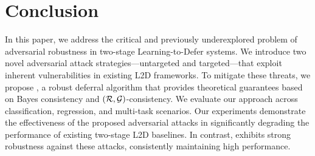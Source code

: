 \section{Conclusion}  
In this paper, we address the critical and previously underexplored problem of adversarial robustness in two-stage Learning-to-Defer systems. We introduce two novel adversarial attack strategies—untargeted and targeted—that exploit inherent vulnerabilities in existing L2D frameworks. To mitigate these threats, we propose \name{}, a robust deferral algorithm that provides theoretical guarantees based on Bayes consistency and \((\mathcal{R}, \mathcal{G})\)-consistency. We evaluate our approach across classification, regression, and multi-task scenarios. Our experiments demonstrate the effectiveness of the proposed adversarial attacks in significantly degrading the performance of existing two-stage L2D baselines. In contrast, \name{} exhibits strong robustness against these attacks, consistently maintaining high performance.






